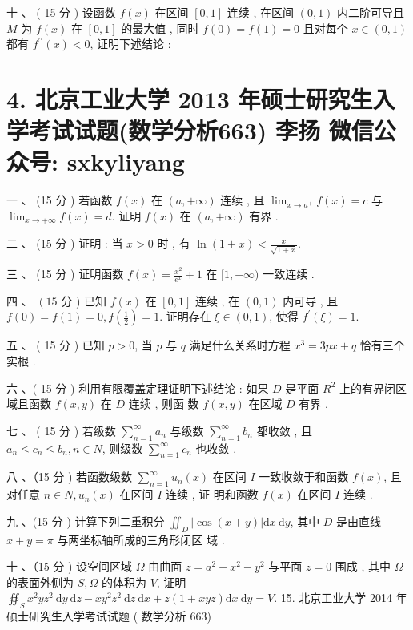 \documentclass[10pt]{article}
\begin{document}
{ 十 、 ( 15  分 )  设函数  $f(x)$  在区间  $[0,1]$  连续 ,  在区间  $(0,1)$  内二阶可导且  $M$  为  $f(x)$  在  $[0,1]$  的最大值 ,  同时  $f(0)=f(1)=0$  且对每个  $x \in(0,1)$  都有  $f^{\prime \prime}(x)<0$,  证明下述结论 :

\section{4. 北京工业大学 2013 年硕士研究生入学考试试题(数学分析663) 
 李扬 
 微信公众号: sxkyliyang}
 一 、 (15  分 )  若函数  $f(x)$  在  $(a,+\infty)$  连续 ,  且  $\lim _{x \rightarrow a^{+}} f(x)=c$  与  $\lim _{x \rightarrow+\infty} f(x)=d$.  证明  $f(x)$  在  $(a,+\infty)$  有界 .

 二 、 (15  分 )  证明 :  当  $x>0$  时 ,  有  $\ln (1+x)<\frac{x}{\sqrt{1+x}}$.

 三 、 (15  分 )  证明函数  $f(x)=\frac{x^{2}}{e^{x}}+1$  在  $[1,+\infty)$  一致连续 .

 四 、 $\left(15\right.$  分 )  已知  $f(x)$  在  $[0,1]$  连续 ,  在  $(0,1)$  内可导 ,  且  $f(0)=f(1)=0, f\left(\frac{1}{2}\right)=1$.  证明存在  $\xi \in(0,1)$,  使得  $f^{\prime}(\xi)=1 .$

 五 、 ( 15  分 )  已知  $p>0$,  当  $p$  与  $q$  满足什么关系时方程  $x^{3}=3 p x+q$  恰有三个实根 .

 六 、( 15  分 )  利用有限覆盖定理证明下述结论 :  如果  $D$  是平面  $R^{2}$  上的有界闭区域且函数  $f(x, y)$  在  $D$  连续 ,  则函   数  $f(x, y)$  在区域  $D$  有界 .

 七 、 ( 15  分 )  若级数  $\sum_{n=1}^{\infty} a_{n}$  与级数  $\sum_{n=1}^{\infty} b_{n}$  都收敛 ,  且  $a_{n} \leq c_{n} \leq b_{n}, n \in N$,  则级数  $\sum_{n=1}^{\infty} c_{n}$  也收敛 .

 八 、（15  分 )  若函数级数  $\sum_{n=1}^{\infty} u_{n}(x)$  在区间  $I$  一致收敛于和函数  $f(x)$,  且对任意  $n \in N, u_{n}(x)$  在区间  $I$  连续 ,  证   明和函数  $f(x)$  在区间  $I$  连续 .

 九 、(15  分 )  计算下列二重积分  $\iint_{D}|\cos (x+y)| \mathrm{d} x \mathrm{~d} y$,  其中  $D$  是由直线  $x+y=\pi$  与两坐标轴所成的三角形闭区   域 .

 十 、（15  分 )  设空间区域  $\Omega$  由曲面  $z=a^{2}-x^{2}-y^{2}$  与平面  $z=0$  围成 ,  其中  $\Omega$  的表面外侧为  $S, \Omega$  的体积为  $V$,  证明  $\oiint_{S} x^{2} y z^{2} \mathrm{~d} y \mathrm{~d} z-x y^{2} z^{2} \mathrm{~d} z \mathrm{~d} x+z(1+x y z) \mathrm{d} x \mathrm{~d} y=V$. 15.  北京工业大学  2014  年硕士研究生入学考试试题 ( 数学分析 663)

}
\end{document}
